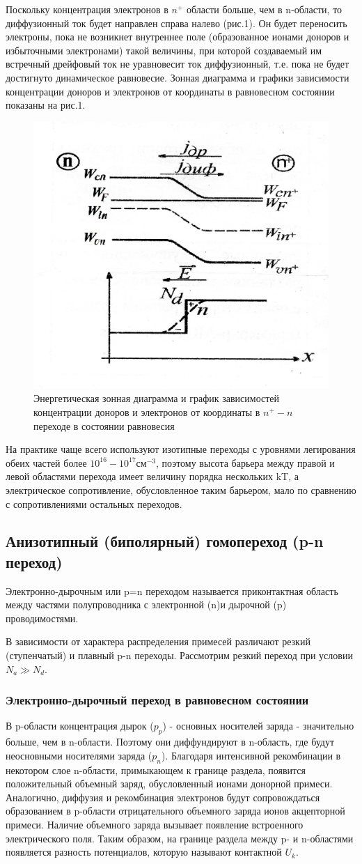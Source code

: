 Поскольку концентрация электронов в $n^+$ области больше, чем в n-области, то диффузионный ток будет направлен справа налево (рис.1). Он будет переносить электроны, пока не возникнет внутреннее поле (образованное ионами доноров и избыточными электронами) такой величины, при которой создаваемый им встречный дрейфовый ток не уравновесит ток диффузионный, т.е. пока не будет достигнуто динамическое равновесие. Зонная диаграмма и графики зависимости концентрации доноров и электронов от координаты в равновесном состоянии показаны на рис.1. 
\begin{figure}[h!]
	\centering
	\includegraphics[width=0.35\linewidth]{imgs/fig1.jpg}
	\caption{Энергетическая зонная диаграмма и график зависимостей концентрации доноров и электронов от координаты в $n^+-n$ переходе в состоянии равновесия}
	\label{fig:1}
\end{figure}

На практике чаще всего используют изотипные переходы с уровнями легирования обеих частей более $10^{16}-10^{17} \text{см}^{-3}$, поэтому высота барьера между правой и левой областями перехода имеет величину порядка нескольких kT, а электрическое сопротивление, обусловленное таким барьером, мало по сравнению с сопротивлениями остальных переходов.  
\subsection{Анизотипный (биполярный) гомопереход (p-n переход)}
Электронно-дырочным или p=n переходом называется приконтактная область между частями полупроводника с электронной (n)и дырочной (p) проводимостями. 

В зависимости от характера распределения примесей различают резкий (ступенчатый) и плавный p-n переходы. Рассмотрим резкий переход при условии $N_a \gg N_d$.

\subsubsection{Электронно-дырочный переход в равновесном состоянии}
В p-области концентрация дырок ($p_p$) - основных носителей заряда - значительно больше, чем в n-области. Поэтому они диффундируют в n-область, где будут неосновными носителями заряда ($p_n$). Благодаря интенсивной рекомбинации в некотором слое n-области, примыкающем к границе раздела, появится положительный объемный заряд, обусловленный ионами донорной примеси. Аналогично, диффузия и рекомбинация электронов будут сопровождаться образованием в p-области отрицательного объемного заряда ионов акцепторной примеси. Наличие объемного заряда вызывает появление встроенного электрического поля. Таким образом, на границе раздела между p- и n-областями появляется разность потенциалов, которую называют контактной $U_k$.

